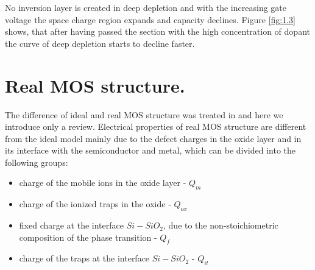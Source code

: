 \iffalse
\par V stave hlbokého ochudobnenia sa nevytvára inverzná vrstva a so
zvyšovaním napätia hradla sa oblasť priestorového náboja naďalej
rozpína a kapacita klesá. Z obrázku \ref{fig:1.3} je vidieť, že po
prekonaní oblasti s vysokou koncentráciou prímesí krivka hlbokého
ochudobnenia začína klesať rýchlejšie.
\fi
\par No inversion layer is created in deep depletion and with the
increasing gate voltage the space charge region expands and capacity
declines. Figure \ref{fig:1.3} shows, that after having passed the
section with the high concentration of dopant the curve of deep
depletion starts to decline faster.

\iffalse
\section{Reálna štruktúra MOS.}  Odlišnosť ideálnej a reálnej
štruktúry MOS bola obsažne spracovaná v práci \cite{1.12} a tu
uvedieme len prehľad tejto problematiky. Elektrické vlastnosti reálnej
štruktúry MOS sa líšia od ideálneho modelu hlavne vplyvom poruchových
nábojov v oxidovej vrstve a na jej rozhraní s polovodičom a kovom,
ktoré možno rozdeliť do nasledovných skupín:
\fi
\section{Real MOS structure.}
The difference of ideal and real MOS structure was treated in
\cite{1.12} and here we introduce only a review. Electrical properties
of real MOS structure are different from the ideal model mainly due to
the defect charges in the oxide layer and in its interface with the
semiconductor and metal, which can be divided into the following
groups:

\iffalse
\begin{itemize}
\item náboj pohyblivých iónov vo vrstve oxidu - $Q_{m}$
\item náboj ionizovaných pascí v oxide - $Q_{ox}$
\item fixný náboj na rozhraní $Si-SiO_2$ , spôsobený nestechiometrickým
  zložením v oblasti fázového prechodu - $Q_f$
\item náboj pascí na rozhraní $Si-SiO_2$  - $Q_{it}$
\end{itemize}
\fi
\begin{itemize}
\item charge of the mobile ions in the oxide layer - $Q_{m}$
\item charge of the ionized traps in the oxide - $Q_{ox}$
\item fixed charge at the interface $Si-SiO_2$, due to the
  non-stoichiometric composition of the phase transition - $Q_f$
\item charge of the traps at the interface $Si-SiO_2$  - $Q_{it}$
\end{itemize}

